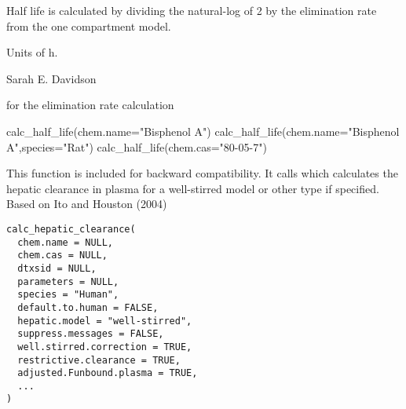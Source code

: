 \documentclass[a4paper]{book}
\begin{document}
%
\begin{Details}\relax
Half life is calculated by dividing the natural-log of 2 by the elimination
rate from the one compartment model.
\end{Details}
%
\begin{Value}
\begin{ldescription}
\item[\code{Half life}] Units of h.
\end{ldescription}
\end{Value}
%
\begin{Author}\relax
Sarah E. Davidson
\end{Author}
%
\begin{SeeAlso} for the elimination rate calculation
\end{SeeAlso}
%
\begin{Examples}
\begin{ExampleCode}

calc_half_life(chem.name="Bisphenol A")
calc_half_life(chem.name="Bisphenol A",species="Rat")
calc_half_life(chem.cas="80-05-7")

\end{ExampleCode}
\end{Examples}
%
\begin{Description}\relax
This function is included for backward compatibility. It calls
 which
calculates the hepatic clearance in plasma for a well-stirred model
or other type if specified. Based on  Ito and Houston (2004)
\end{Description}
%
\begin{Usage}
\begin{verbatim}
calc_hepatic_clearance(
  chem.name = NULL,
  chem.cas = NULL,
  dtxsid = NULL,
  parameters = NULL,
  species = "Human",
  default.to.human = FALSE,
  hepatic.model = "well-stirred",
  suppress.messages = FALSE,
  well.stirred.correction = TRUE,
  restrictive.clearance = TRUE,
  adjusted.Funbound.plasma = TRUE,
  ...
)
\end{verbatim}
\end{Usage}
%
\end{document}

